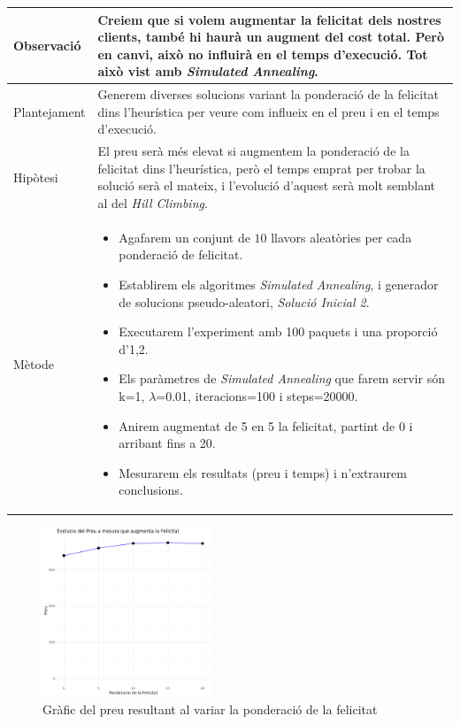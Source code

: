 \documentclass[a4paper]{article}
\begin{document}
	\begin{table}[ht]
		\centering
		\begin{tabular}{|l|p{10cm}|}
			\hline
			Observació & Creiem que si volem augmentar la felicitat dels nostres clients, també hi haurà un augment del cost total. Però en canvi, això no influirà en el temps d'execució. Tot això vist amb \textit{Simulated Annealing}. \\
			\hline
			Plantejament & Generem diverses solucions variant la ponderació de la felicitat dins l'heurística per veure com influeix en el preu i en el temps d'execució. \\
			\hline
			Hipòtesi & El preu serà més elevat si augmentem la ponderació de la felicitat dins l'heurística, però el temps emprat per trobar la solució serà el mateix, i l'evolució d'aquest serà molt semblant al del \textit{Hill Climbing}. \\
			\hline
			Mètode & 
			\begin{itemize}
				\item Agafarem un conjunt de $10$ llavors aleatòries per cada ponderació de felicitat.
				\item Establirem els algoritmes \textit{Simulated Annealing}, i generador de solucions pseudo-aleatori, \textit{Solució Inicial 2}.
				\item Executarem l'experiment amb 100 paquets i una proporció d'1,2.
				\item Els paràmetres de \textit{Simulated Annealing} que farem servir són k=1, $\lambda$=0.01, iteracions=100 i steps=20000.
				\item Anirem augmentat de 5 en 5 la felicitat, partint de 0 i arribant fins a 20.
				\item Mesurarem els resultats (preu i temps) i n'extraurem conclusions.
			\end{itemize} \\
			\hline
		\end{tabular}
		\label{tab:exp7_apartats}
	\end{table}
	
	\begin{figure}[H]
		\centering
		\includegraphics[width=0.45\textwidth]{images/exp7_grafic.png}
		\caption{Gràfic del preu resultant al variar la ponderació de la felicitat}
		\label{fig:exp7_grafic}
	\end{figure}
	
\end{document}
